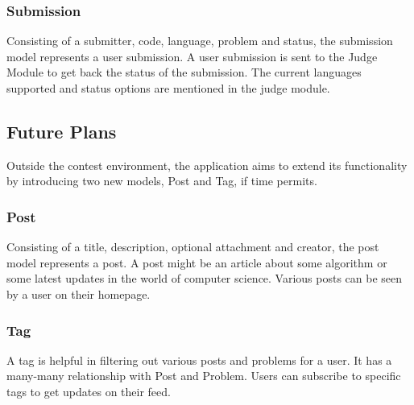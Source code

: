 \subsubsection{Submission}
Consisting of a submitter, code, language, problem and status, the submission model represents a user submission. A user submission is sent to the Judge Module to get back the status of the submission. The current languages supported and status options are mentioned in the judge module.

\subsection{Future Plans}
Outside the contest environment, the application aims to extend its functionality by introducing two new models, Post and Tag, if time permits.

\subsubsection{Post}
Consisting of a title, description, optional attachment and creator, the post model represents a post. A post might be an article about some algorithm or some latest updates in the world of computer science. Various posts can be seen by a user on their homepage.

\subsubsection{Tag}
A tag is helpful in filtering out various posts and problems for a user. It has a many-many relationship with Post and Problem. Users can subscribe to specific tags to get updates on their feed.